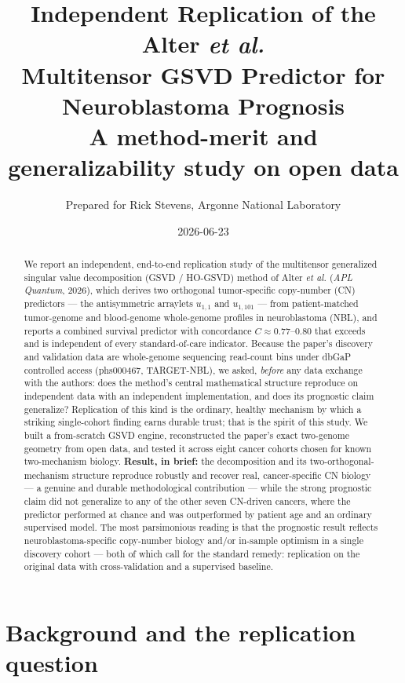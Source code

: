 \documentclass[11pt]{article}
\title{\textbf{Independent Replication of the Alter \emph{et al.} \\
Multitensor GSVD Predictor for Neuroblastoma Prognosis}\\[4pt]
\large A method-merit and generalizability study on open data}
\author{Prepared for Rick Stevens, Argonne National Laboratory}
\date{2026-06-23}
\newcommand{\C}{\textit{C}}
\begin{document}
\maketitle
\thispagestyle{fancy}

\begin{abstract}
\noindent
We report an independent, end-to-end replication study of the multitensor
generalized singular value decomposition (GSVD / HO-GSVD) method of Alter
\emph{et al.} (\emph{APL Quantum}, 2026), which derives two orthogonal
tumor-specific copy-number (CN) predictors --- the antisymmetric arraylets
$u_{1,1}$ and $u_{1,101}$ --- from patient-matched tumor-genome and blood-genome
whole-genome profiles in neuroblastoma (NBL), and reports a combined survival
predictor with concordance $\C\approx0.77$--$0.80$ that exceeds and is independent
of every standard-of-care indicator. Because the paper's discovery and validation
data are whole-genome sequencing read-count bins under dbGaP controlled access
(phs000467, TARGET-NBL), we asked, \emph{before} any data exchange with the
authors: does the method's central mathematical structure reproduce on
independent data with an independent implementation, and does its prognostic
claim generalize? Replication of this kind is the ordinary, healthy mechanism by
which a striking single-cohort finding earns durable trust; that is the spirit of
this study. We built a from-scratch GSVD engine, reconstructed the paper's exact
two-genome geometry from open data, and tested it across eight cancer cohorts
chosen for known two-mechanism biology. \textbf{Result, in brief:} the
decomposition and its two-orthogonal-mechanism structure reproduce robustly and
recover real, cancer-specific CN biology --- a genuine and durable methodological
contribution --- while the strong prognostic claim did not generalize to any of
the other seven CN-driven cancers, where the predictor performed at chance and was
outperformed by patient age and an ordinary supervised model. The most
parsimonious reading is that the prognostic result reflects neuroblastoma-specific
copy-number biology and/or in-sample optimism in a single discovery cohort --- both
of which call for the standard remedy: replication on the original data with
cross-validation and a supervised baseline.
\end{abstract}

\section{Background and the replication question}
\end{document}

